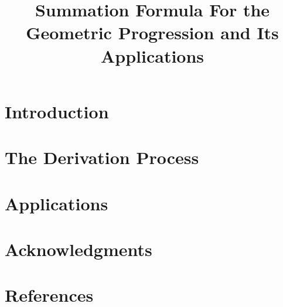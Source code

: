 \title{Summation Formula For the Geometric Progression and Its Applications}

\maketitle



\setcounter{tocdepth}{2}\tableofcontents\clearpage

\section{Introduction}


\section{The Derivation Process}


\section{Applications}


\section{Acknowledgments}
\clearpage

\section{References}
\clearpage

\appendix

